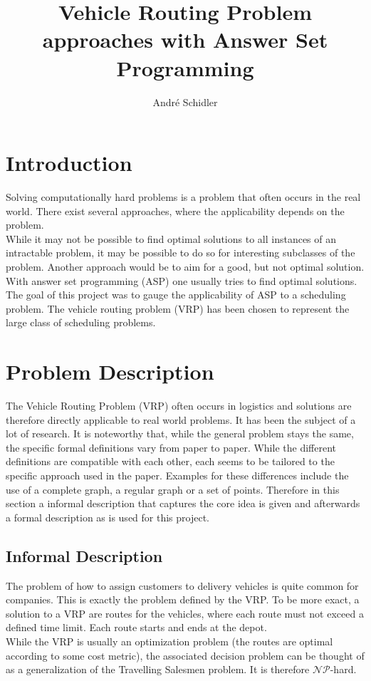 \documentclass[12pt, letterpaper]{article}
\title{Vehicle Routing Problem approaches with Answer Set Programming}
\author{André Schidler}
\begin{document}
\maketitle

\section{Introduction}
Solving computationally hard problems is a problem that often occurs in the real world. There exist several approaches, where the applicability depends on the problem.\\
While it may not be possible to find optimal solutions to all instances of an intractable problem, it may be possible to do so for interesting subclasses of the problem. Another approach would be to aim for a good, but not optimal solution.\\
With answer set programming (ASP) one usually tries to find optimal solutions. The goal of this project was to gauge the applicability of ASP to a scheduling problem. The vehicle routing problem (VRP) has been chosen to represent the large class of scheduling problems.

\section{Problem Description}
The Vehicle Routing Problem (VRP) often occurs in logistics and solutions are therefore directly applicable to real world problems. It has been the subject of a lot of research.
It is noteworthy that, while the general problem stays the same, the specific formal definitions vary from paper to paper. While the different definitions are compatible with each other, each seems to be tailored to the specific approach used in the paper. Examples for these differences include the use of a complete graph, a regular graph or a set of points.
Therefore in this section a informal description that captures the core idea is given and afterwards a formal description as is used for this project.

\subsection{Informal Description}
The problem of how to assign customers to delivery vehicles is quite common for companies. This is exactly the problem defined by the VRP. To be more exact, a solution to a VRP are routes for the vehicles, where each route must not exceed a defined time limit. Each route starts and ends at the depot.\\
While the VRP is usually an optimization problem (the routes are optimal according to some cost metric), the associated decision problem can be thought of as a generalization of the Travelling Salesmen problem. It is therefore $\mathcal{NP}$-hard.\\
\end{document}
